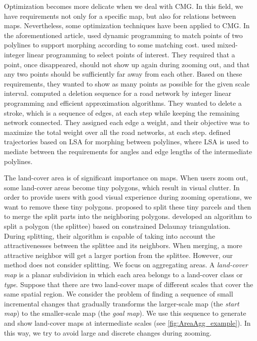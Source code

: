 \documentclass[acmsmall,natbib=false]{acmart}
\begin{document}
Optimization becomes more delicate
when we deal with CMG.
In this field, we have requirements 
not only for a specific map, 
but also for relations between maps. 
%
Nevertheless, some optimization techniques 
have been applied to CMG.
In the aforementioned article,
\textcite{Noellenburg2008} used dynamic programming
to match points of two polylines to support morphing
according to some matching cost.
\textcite{sahw-oarps-ICAGW13} used 
mixed-integer linear programming 
to select points of interest.
They required that 
a point, once disappeared, should not show up again 
during zooming out, 
and that any two points should be 
sufficiently far away from each other.
Based on these requirements, 
they wanted to show as many points as possible 
for the given scale interval.
\textcite{Chimani2014Eat} computed a deletion sequence
for a road network by integer linear programming
and efficient approximation algorithms.
They wanted to delete a stroke, 
which is a sequence of edges, at each step
while keeping the remaining network connected.
They assigned each edge a weight, 
and their objective was to maximize the total weight 
over all the road networks, at each step.
\textcite{Peng2013LSA} defined trajectories 
based on LSA for morphing between polylines, 
where LSA is used to mediate between the requirements 
for angles and edge lengths of the intermediate polylines.



The land-cover area is of significant importance on maps.
When users zoom out, some land-cover areas become
tiny polygons, which result in visual clutter.
In order to provide users 
with good visual experience during zooming operations,
we want to remove these tiny polygons.
\textcite{Smith2007MasterMap,Thiemann2018LandCover} 
proposed to split these tiny parcels 
and then to merge the split parts into the neighboring polygons.
\textcite{Meijers2016Split} developed an algorithm 
to split a polygon (the splittee) 
based on constrained Delaunay triangulation.
During splitting, their algorithm is capable of
taking into account
the attractivenesses between the splittee and its neighbors.
When merging, a more attractive neighbor 
will get a larger portion from the splittee.
However, our method does not consider splitting.
We focus on aggregating areas.
A \emph{land-cover map} is a planar subdivision in which each 
area belongs to a
land-cover class or \emph{type}.
Suppose that there are two land-cover maps of 
different scales 
that cover the same spatial region.
We consider the problem of finding a sequence 
of small incremental changes 
that gradually transforms 
the larger-scale map (the \emph{start map}) to 
the smaller-scale map (the \emph{goal map}).
We use this sequence to generate and show land-cover maps at 
intermediate scales (see \fig\ref{fig:AreaAgg_example}).
In this way, we try to avoid large and discrete changes
during zooming.
\end{document}
